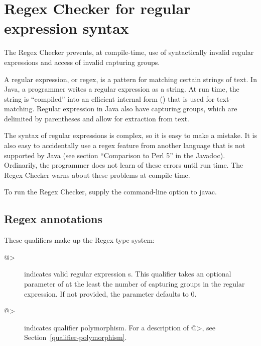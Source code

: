 \htmlhr
\chapter{Regex Checker for regular expression syntax\label{regex-checker}}

The Regex Checker prevents, at compile-time, use of syntactically invalid
regular expressions and access of invalid capturing groups.

A regular expression, or regex, is a pattern for matching certain strings
of text.  In Java, a programmer writes a regular expression as a string.
At run time, the string is ``compiled'' into an efficient internal form
() that is used for
text-matching. Regular expression in Java also have capturing groups, which
are delimited by parentheses and allow for extraction from text.

The syntax of regular expressions is complex, so it is easy to make a
mistake.  It is also easy to accidentally use a regex feature from another
language that is not supported by Java (see section ``Comparison to Perl
5'' in the  Javadoc).
Ordinarily, the programmer does not learn of these errors until run time.
The Regex Checker warns about these problems at compile time.

To run the Regex Checker, supply the  command-line option to javac.


\section{Regex annotations\label{regex-annotations}}

These qualifiers make up the Regex type system:

\begin{description}

\item[\<@>]
  indicates valid regular expression s. This qualifier takes
  an optional parameter of at the least the number of capturing groups in
  the regular expression. If not provided, the parameter defaults to 0.

\item[\<@>]
  indicates qualifier polymorphism. For a description of
  \<@>,
  see Section~\ref{qualifier-polymorphism}.

\end{description}

